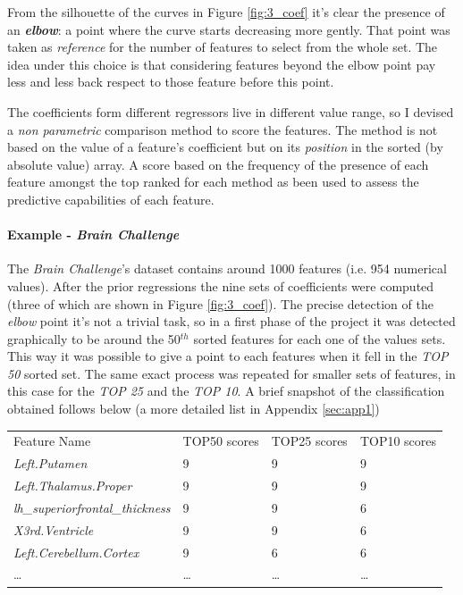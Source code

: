 \documentclass{article}
\begin{document}
From the silhouette of the curves in Figure \ref{fig:3_coef} it's clear the presence of an \textbf{\emph{elbow}}: a point where the curve starts decreasing more gently. That point was taken as \emph{reference} for the number of features to select from the whole set. The idea under this choice is that considering features beyond the elbow point pay less and less back respect to those feature before this point.

The coefficients form different regressors live in different value range, so I devised a \emph{non parametric} comparison method to score the features. The method is not based on the value of a feature's coefficient but on its \emph{position} in the sorted (by absolute value) array. A score based on the frequency of the presence of each feature amongst the top ranked for each method as been used to assess the predictive capabilities of each feature.

\paragraph{Example - \emph{Brain Challenge}}
The \emph{Brain Challenge}'s dataset contains around 1000 features (i.e. 954 numerical values). After the prior regressions the nine sets of coefficients were computed (three of which are shown in Figure \ref{fig:3_coef}). The precise detection of the \emph{elbow} point it's not a trivial task, so in a first phase of the project it was detected graphically to be around the 50$^{th}$ sorted features for each one of the values sets. This way it was possible to give a point to each features when it fell in the \emph{TOP 50} sorted set. The same exact process was repeated for smaller sets of features, in this case for the \emph{TOP 25} and the \emph{TOP 10}. A brief snapshot of the classification obtained follows below (a more detailed list in  Appendix \ref{sec:app1})

\begin{table}[ht]
\begin{tabular}{llll}
Feature Name                                        & TOP50 scores & TOP25 scores & TOP10 scores \\
\textit{Left.Putamen}                               & 9             & 9             & 9             \\
\textit{Left.Thalamus.Proper}                       & 9             & 9             & 9             \\
\textit{lh\_superiorfrontal\_thickness}             & 9             & 9             & 6             \\
\textit{X3rd.Ventricle}                             & 9             & 9             & 6             \\
\textit{Left.Cerebellum.Cortex}                     & 9             & 6             & 6             \\
\dots																								& \dots					&\dots 					&\dots
\end{tabular}
\end{table}
\end{document}
